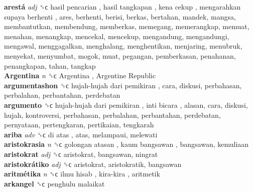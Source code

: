 \textbf{arestá} \emph{adj}  ␝ϲ   hasil pencarian ,  hasil tangkapan ,  kena cekup ,  mengarahkan supaya berhenti , ares, berhenti, berisi, berkas, bertahan, mandek, mangsa, membantutkan, membendung, memberkas, memegang, memerangkap, memuat, menahan, menangkap, mencekal, mencekup, mengandung, mengandungi, mengawal, menggagalkan, menghalang, menghentikan, menjaring, menubruk, menyekat, menyumbat, mogok, muat, pegangan, pemberkasan, penahanan, penangkapan, tahan, tangkap  \\
\textbf{Argentina} \emph{n}  ␝ϲ   Argentina ,  Argentine Republic   \\
\textbf{argumentashon} ␝ϲ   hujah-hujah dari pemikiran , cara, diskusi, perbahasan, perbalahan, perbantahan, perdebatan  \\
\textbf{argumento} ␝ϲ   hujah-hujah dari pemikiran ,  inti bicara , alasan, cara, diskusi, hujah, kontroversi, perbahasan, perbalahan, perbantahan, perdebatan, pernyataan, pertengkaran, pertikaian, tengkarah  \\
\textbf{ariba} \emph{adv}  ␝ϲ   di atas , atas, melampaui, melewati  \\
\textbf{aristokrasia} \emph{n}  ␝ϲ   golongan atasan ,  kaum bangsawan , bangsawan, kemuliaan  \\
\textbf{aristokrat} \emph{adj}  ␝ϲ  aristokrat, bangsawan, ningrat  \\
\textbf{aristokrátiko} \emph{adj}  ␝ϲ  aristokrat, aristokratik, bangsawan  \\
\textbf{aritmétika} \emph{n}  ␝ϲ   ilmu hisab ,  kira-kira , aritmetik  \\
\textbf{arkangel} ␝ϲ   penghulu malaikat   \\
